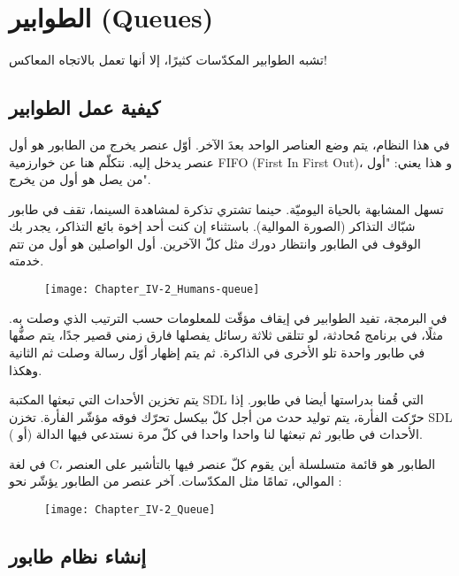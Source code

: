 \section{الطوابير (\textenglish{Queues})}

تشبه الطوابير المكدّسات كثيرًا، إلا أنها تعمل بالاتجاه المعاكس!

\subsection{كيفية عمل الطوابير}

في هذا النظام، يتم وضع العناصر الواحد بعدَ الآخر. أوّل عنصر يخرج من الطابور هو أول عنصر يدخل إليه. نتكلّم هنا عن خوارزمية 
\textenglish{FIFO} (\textenglish{First In First Out})،
و هذا يعني: "أول من يصل هو أول من يخرج".

تسهل المشابهة بالحياة اليوميّة. حينما تشتري تذكرة لمشاهدة السينما، تقف في طابور شبّاك التذاكر (الصورة الموالية). باستثناء إن كنت أحد إخوة بائع التذاكر، يجدر بك الوقوف في الطابور وانتظار دورك مثل كلّ الآخرين. أول الواصلين هو أول من تتم خدمته.

\begin{figure}[H]
	\centering
	\texttt{[image: Chapter\_IV-2\_Humans-queue]}
\end{figure}

 في البرمجة، تفيد الطوابير في إيقاف مؤقّت للمعلومات حسب الترتيب الذي وصلت به. مثلًا، في برنامج مُحادثة، لو تتلقى ثلاثة رسائل يفصلها فارق زمني قصير جدًا، يتم صفُّها في طابور واحدة تلو الأخرى في الذاكرة. ثم يتم إظهار أوّل رسالة وصلت ثم الثانية وهكذا.
 
يتم تخزين الأحداث التي تبعثها المكتبة
\textenglish{SDL}
التي قُمنا بدراستها أيضا في طابور. إذا حرّكت الفأرة، يتم توليد حدث من أجل كلّ بيكسل تحرّك فوقه مؤشّر الفأرة. تخزن
\textenglish{SDL}
الأحداث في طابور ثم تبعثها لنا واحدا واحدا في كلّ مرة نستدعي فيها الدالة
(أو
).

في لغة
\textenglish{C}،
الطابور هو قائمة متسلسلة أين يقوم كلّ عنصر فيها بالتأشير على العنصر الموالي، تمامًا مثل المكدّسات. آخر عنصر من الطابور يؤشّر نحو
:

\begin{figure}[H]
	\centering
	\texttt{[image: Chapter\_IV-2\_Queue]}
\end{figure}

\subsection{إنشاء نظام طابور}

